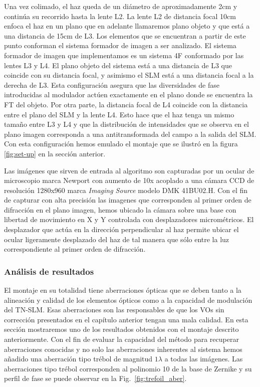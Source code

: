 Una vez colimado, el haz queda de un
 diámetro de aproximadamente 2cm y continúa su recorrido hasta la
 lente L2. La lente L2 de distancia focal 10cm enfoca el haz en un
 plano que en adelante llamaremos plano objeto y que está a una
 distancia de 15cm de L3. Los elementos que se encuentran a partir de este
 punto conforman el sistema formador de imagen a ser
 analizado.
El sistema formador de imagen
 que implementamos es un sistema 4F conformado por las lentes L3 y
 L4. El plano objeto del sistema está a una distancia de L3 que coincide con su
 distancia focal, y asimismo el SLM está a una distancia focal a la
 derecha de L3. Esta configuración asegura que las diversidades de
 fase introducidas al modulador actúen 
 exactamente en el plano donde se encuentra la FT del objeto.       
Por otra parte, la distancia focal de L4 coincide con la distancia
entre el plano del SLM y la lente L4. Esto hace que el haz tenga un
mismo tamaño entre L3 y L4 y que la distribución de intensidades que
se observa en el plano imagen corresponda a una antitransformada del
campo a la salida del SLM. Con esta configuración hemos emulado el
montaje que se ilustró en la figura \ref{fig:set-up} en la sección
anterior. 

Las imágenes que sirven de entrada al algoritmo son capturadas por un
ocular de microscopio marca Newport con aumento de 10x acoplado a una cámara
CCD de resolución 1280x960 marca \textit{Imaging Source} modelo DMK
41BU02.H. Con el fin de capturar con alta precisión las imagenes que corresponden al
primer orden de difracción en el plano imagen, hemos ubicado la cámara
sobre una base con libertad de movimiento en X y Y controlada con
desplazadores micrométricos. El desplazador que actúa en la dirección
perpendicular al haz permite ubicar el ocular ligeramente desplazado
del haz de tal manera que sólo entre la luz correspondiente al primer
orden de difracción. 

\subsubsection{Análisis de resultados}

El montaje en su totalidad tiene aberraciones ópticas que se deben
tanto a la alineación y calidad de los elementos ópticos como a la
capacidad de modulación del TN-SLM. Esas aberraciones son las
responsables de que los VOs sin corrección presentados en el capítulo
anterior tengan una mala calidad. En esta sección mostraremos uno de
los resultados obtenidos con el montaje descrito anteriormente. Con el
fin de evaluar la capacidad del método para recuperar aberraciones
conocidas y no solo las aberraciones inherentes al sistema hemos
añadido una aberración tipo trébol de magnitud $1\lambda$ a todas las
imágenes. Las aberraciones tipo trébol corresponden al
polinomio 10 de la base de Zernike y su perfil de fase se puede
observar en la Fig.~\ref{fig:trefoil_aber}.  

